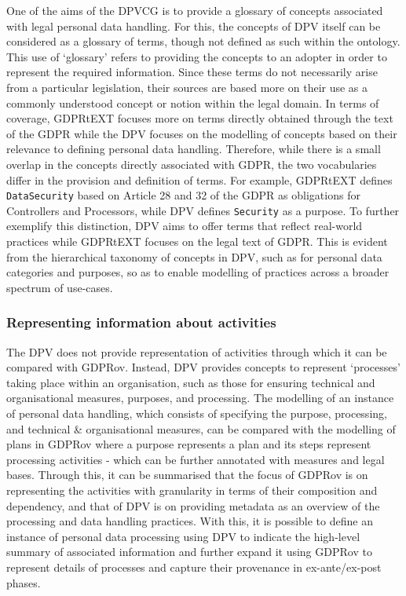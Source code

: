 One of the aims of the DPVCG is to provide a glossary of concepts associated with legal personal data handling. For this, the concepts of DPV itself can be considered as a glossary of terms, though not defined as such within the ontology. This use of `glossary' refers to providing the concepts to an adopter in order to represent the required information. Since these terms do not necessarily arise from a particular legislation, their sources are based more on their use as a commonly understood concept or notion within the legal domain.
In terms of coverage, GDPRtEXT focuses more on terms directly obtained through the text of the GDPR while the DPV focuses on the modelling of concepts based on their relevance to defining personal data handling.
Therefore, while there is a small overlap in the concepts directly associated with GDPR, the two vocabularies differ in the provision and definition of terms. For example, GDPRtEXT defines \texttt{DataSecurity} based on Article 28 and 32 of the GDPR as obligations for Controllers and Processors, while DPV defines \texttt{Security} as a purpose. To further exemplify this distinction, DPV aims to offer terms that reflect real-world practices while GDPRtEXT focuses on the legal text of GDPR. This is evident from the hierarchical taxonomy of concepts in DPV, such as for personal data categories and purposes, so as to enable modelling of practices across a broader spectrum of use-cases.

\subsubsection{Representing information about activities}
The DPV does not provide representation of activities through which it can be compared with GDPRov.
Instead, DPV provides concepts to represent `processes' taking place within an organisation, such as those for ensuring technical and organisational measures, purposes, and processing.
The modelling of an instance of personal data handling, which consists of specifying the purpose, processing, and technical \& organisational measures, can be compared with the modelling of plans in GDPRov where a purpose represents a plan and its steps represent processing activities - which can be further annotated with measures and legal bases.
Through this, it can be summarised that the focus of GDPRov is on representing the activities with granularity in terms of their composition and dependency, and that of DPV is on providing metadata as an overview of  the processing and data handling practices. With this, it is possible to define an instance of personal data processing using DPV to indicate the high-level summary of associated information and further expand it using GDPRov to represent details of processes and capture their provenance in ex-ante/ex-post phases.

